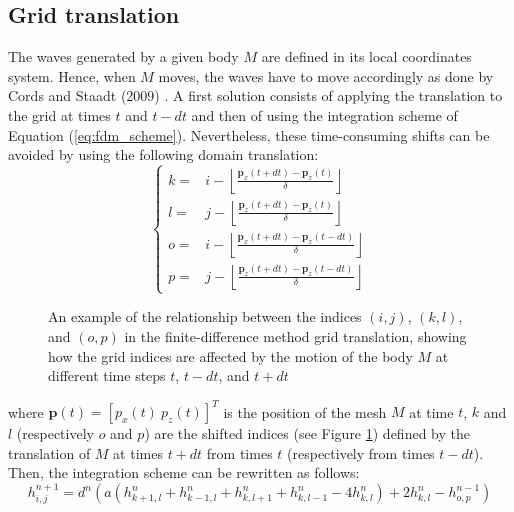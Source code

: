 \documentclass[final]{jcgt}
\begin{document}
\subsection{Grid translation}
\label{subsec:gridTranslation}
The waves generated by a given body $M$ are defined in its local coordinates system.
Hence, when $M$ moves, the waves have to move accordingly as done by Cords and Staadt (2009) \cite{cordsRealTimeOpenWater2009}.
A first solution consists of applying the translation to the grid at times $t$ and $t-dt$ and then of using the integration scheme of Equation (\ref{eq:fdm_scheme}).
Nevertheless, these time-consuming shifts can be avoided by using the following domain translation:
\begin{equation}
	\begin{cases}
		k = & i - \left\lfloor\frac{\mathbf{p}_x(t+dt)-\mathbf{p}_x(t)}{\delta}\right\rfloor    \\
		l = & j - \left\lfloor\frac{\mathbf{p}_z(t+dt)-\mathbf{p}_z(t)}{\delta}\right\rfloor    \\
		o = & i - \left\lfloor\frac{\mathbf{p}_x(t+dt)-\mathbf{p}_x(t-dt)}{\delta}\right\rfloor \\
		p = & j - \left\lfloor\frac{\mathbf{p}_z(t+dt)-\mathbf{p}_z(t-dt)}{\delta}\right\rfloor
	\end{cases}
\end{equation}


\begin{figure}[!h]
	\centering
	
	\caption{An example of the relationship between the indices $(i,j)$, $(k,l)$, and $(o,p)$ in the finite-difference method grid translation, showing how the grid indices are affected by the motion of the body $M$ at different time steps $t$, $t-dt$, and $t+dt$}
	\label{fig:mdfIndices}
\end{figure}


where $\mathbf p(t)=\left[p_x(t)\ p_z(t)\right]^T$ is the position of the mesh $M$ at time $t$, $k$ and $l$ (respectively $o$ and $p$) are the shifted indices (see Figure \ref{fig:mdfIndices}) defined by the translation of $M$ at times $t+dt$ from times $t$ (respectively from times $t-dt$).
Then, the integration scheme can be rewritten as follows:
\begin{equation}
	\label{eq:fdm_scheme_corrected}
	h_{i,j}^{n+1} = d^n\left(a\left(h_{k+1,l}^n+h_{k-1,l}^n+h_{k,l+1}^n+h_{k,l-1}^n- 4 h_{k,l}^n\right) + 2 h_{k,l}^n - h_{o,p}^{n-1}\right)
\end{equation}
\end{document}
